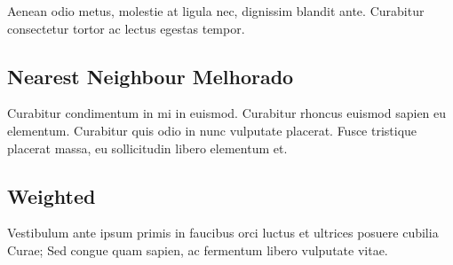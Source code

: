 Aenean odio metus, molestie at ligula nec, dignissim blandit ante. Curabitur
consectetur tortor ac lectus egestas tempor.

\subsection{Nearest Neighbour Melhorado}

Curabitur condimentum in mi in euismod. Curabitur rhoncus euismod sapien eu elementum. Curabitur quis odio in nunc vulputate placerat. Fusce tristique placerat massa, eu sollicitudin libero elementum et.

\subsection{Weighted}

Vestibulum ante ipsum primis in faucibus orci luctus et ultrices posuere cubilia Curae; Sed congue quam sapien, ac fermentum libero vulputate vitae.